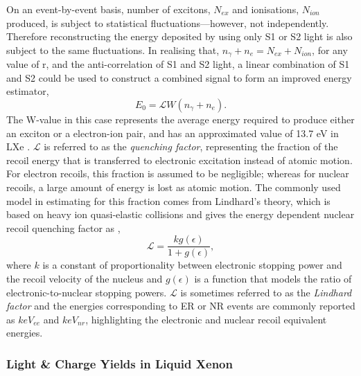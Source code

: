 On an event-by-event basis, number of excitons, $N_{ex}$ and ionisations, $N_{ion}$ produced, is subject to statistical fluctuations---however, not independently. Therefore reconstructing the energy deposited by using only S1 or S2 light is also subject to the same fluctuations. In realising that, $ n_{\gamma} + n_{e} = N_{ex} + N_{ion}$, for any value of r, and the anti-correlation of S1 and S2 light, a linear combination of S1 and S2 could be used to construct a combined signal to form an improved energy estimator,
%
\begin{equation} \label{eq:combined_energy}
    E_{0} = \mathcal{L}W(n_{\gamma} + n_{e}). 
\end{equation}
%
The W-value in this case represents the average energy required to produce either an exciton or a electron-ion pair, and has an approximated value of 13.7 eV in LXe \cite{Dahl}. $\mathcal{L}$ is referred to as the \textit{quenching factor}, representing the fraction of the recoil energy that is transferred to electronic excitation instead of atomic motion. For electron recoils, this fraction is assumed to be negligible; whereas for nuclear recoils, a large amount of energy is lost as atomic motion. The commonly used model in estimating for this fraction comes from Lindhard’s theory, which is based on heavy ion quasi-elastic collisions and gives the energy dependent nuclear recoil quenching factor as \cite{Lindhard},
%
\begin{equation} \label{eq:combined_energy}
    \mathcal{L} = \frac{kg(\epsilon)}{1 + g(\epsilon)},
\end{equation}
%
where $k$ is a constant of proportionality between electronic stopping power and the recoil velocity of the nucleus and $g(\epsilon)$ is a function that models the ratio of electronic-to-nuclear stopping powers. $\mathcal{L}$ is sometimes referred to as the \textit{Lindhard factor} and the energies corresponding to ER or NR events are commonly reported as $keV_{ee}$ and $keV_{nr}$, highlighting the electronic and nuclear recoil equivalent energies.

\subsubsection{Light \& Charge Yields in Liquid Xenon}
\label{subsubsec:light_charge}

